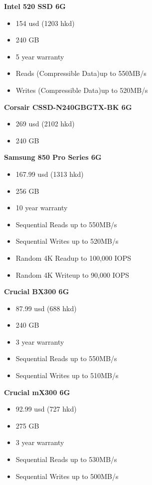 \textbf{Intel 520 SSD 6G}

\begin{itemize}
\item 154 usd (1203 hkd)
\item 240 GB 
\item 5 year warranty
\item Reads (Compressible Data)up to 550MB/s
\item Writes (Compressible Data)up to 520MB/s
\end{itemize}

\textbf{Corsair CSSD-N240GBGTX-BK 6G}

\begin{itemize}
\item 269 usd (2102 hkd)
\item 240 GB 
\end{itemize}

\textbf{Samsung 850 Pro Series 6G}

\begin{itemize}
\item 167.99 usd (1313 hkd)
\item 256 GB 
\item 10 year warranty
\item Sequential Reads up to 550MB/s
\item Sequential Writes up to 520MB/s
\item Random 4K Readup to 100,000 IOPS
\item Random 4K Writeup to 90,000 IOPS
\end{itemize}

\textbf{Crucial BX300 6G}

\begin{itemize}
\item 87.99 usd (688 hkd)
\item 240 GB 
\item 3 year warranty
\item Sequential Reads up to 550MB/s
\item Sequential Writes up to 510MB/s
\end{itemize}

\textbf{Crucial mX300 6G}

\begin{itemize}
\item 92.99 usd (727 hkd)
\item 275 GB 
\item 3 year warranty
\item Sequential Reads up to 530MB/s
\item Sequential Writes up to 500MB/s
\end{itemize}

